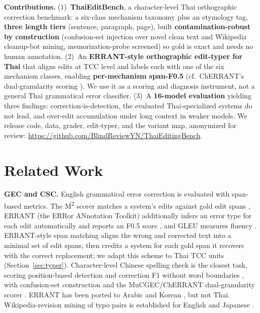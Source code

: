 \documentclass[11pt]{article}
\begin{document}
\noindent\textbf{Contributions.}
(1)~\textbf{ThaiEditBench}, a character-level Thai orthographic correction benchmark: a
six-class mechanism taxonomy plus an etymology tag, \textbf{three length tiers} (sentence,
paragraph, page), built \textbf{contamination-robust by construction} (confusion-set injection
over novel clean text and Wikipedia cleanup-bot mining, memorization-probe screened) so gold is
exact and needs no human annotation.
(2)~An \textbf{ERRANT-style orthographic edit-typer for Thai} that aligns edits at TCC level
and labels each with one of the six mechanism classes, enabling \textbf{per-mechanism
span-F0.5} (cf.\ ChERRANT's dual-granularity scoring \citep{zhang-etal-2022-mucgec}). We use
it as a scoring and diagnosis instrument, not a general Thai grammatical error classifier.
(3)~A \textbf{16-model evaluation} yielding three findings: correction-is-detection, the
evaluated Thai-specialized systems do not lead, and over-edit accumulation under long context
in weaker models.
We release code, data, grader, edit-typer, and the variant map, anonymized for review:
\url{https://github.com/BlindReviewYN/ThaiEditingBench}.

\section{Related Work}

\noindent\textbf{GEC and CSC.} English grammatical error correction is evaluated with
span-based metrics. The M\textsuperscript{2} scorer matches a system's edits against gold edit
spans \citep{dahlmeier-ng-2012-better}, ERRANT (the ERRor ANnotation Toolkit) additionally
infers an error type for each edit automatically and reports an F0.5 score
\citep{bryant-etal-2017-automatic}, and GLEU measures
fluency \citep{napoles-etal-2015-ground}. ERRANT-style span matching aligns the wrong and
corrected text into a minimal set of edit spans, then credits a system for each gold span it
recovers with the correct replacement; we adapt this scheme to Thai TCC units
(Section~\ref{sec:typer}). Character-level Chinese spelling check is the closest task, scoring
position-based detection and correction F1 without word boundaries
\citep{tseng-etal-2015-introduction,wu-etal-2013-chinese,yu-etal-2014-overview}, with
confusion-set construction \citep{liu-etal-2011-visually} and the MuCGEC/ChERRANT
dual-granularity scorer \citep{zhang-etal-2022-mucgec}. ERRANT has been ported to Arabic
\citep{belkebir-habash-2021-automatic} and Korean \citep{yoon-etal-2023-towards}, but not Thai.
Wikipedia-revision mining of typo pairs is established for English
\citep{grundkiewicz-junczysdowmunt-2014-wiked} and Japanese
\citep{tanaka-etal-2020-building}.
\end{document}

